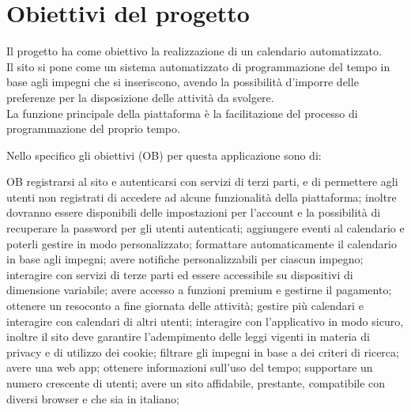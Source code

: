 \section{Obiettivi del progetto}
\label{secD1:ObiettiviDelProgetto}

Il progetto ha come obiettivo la realizzazione di un calendario automatizzato.\\
Il sito si pone come un sistema automatizzato di programmazione del tempo in base agli impegni che si inseriscono, avendo la possibilità d'imporre delle preferenze per la disposizione delle attività da svolgere.\\
La funzione principale della piattaforma è la facilitazione del processo di programmazione del proprio tempo.

\vspace{0.5cm}

Nello specifico gli obiettivi (OB) per questa applicazione sono di:
\begin{listaPersonale}{OB}
       registrarsi al sito e autenticarsi con servizi di terzi parti, e di permettere agli utenti non registrati di accedere ad alcune funzionalità della piattaforma; inoltre dovranno essere disponibili delle impostazioni per l'account e la possibilità di recuperare la password per gli utenti autenticati;
       aggiungere eventi al calendario e poterli gestire in modo personalizzato;
       formattare automaticamente il calendario in base agli impegni;
       avere notifiche personalizzabili per ciascun impegno;
       interagire con servizi di terze parti ed essere accessibile su dispositivi di dimensione variabile;
       avere accesso a funzioni premium e gestirne il pagamento;
       ottenere un resoconto a fine giornata delle attività;
       gestire più calendari e interagire con calendari di altri utenti;
       interagire con l'applicativo in modo sicuro, inoltre il sito deve garantire l'adempimento delle leggi vigenti in materia di privacy e di utilizzo dei cookie;
       filtrare gli impegni in base a dei criteri di ricerca;
       avere una web app;
       ottenere informazioni sull'uso del tempo;
       supportare un numero crescente di utenti;
       avere un sito affidabile, prestante, compatibile con diversi browser e che sia in italiano;
\end{listaPersonale}
